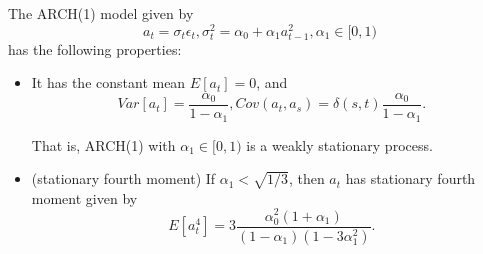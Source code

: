 \begin{lemma}\label{ch:time-series-analysis:th:weakStationaryARCH(1)}
The ARCH(1) model given by
$$a_t = \sigma_t \epsilon_t, \sigma_t^2 = \alpha_0 + \alpha_1a_{t-1}^2, \alpha_1 \in [0,1)$$
has the following properties:
\begin{itemize}
	\item It has the constant mean $E[a_t] = 0$, and $$Var[a_t] = \frac{\alpha_0}{1 - \alpha_1},Cov(a_t,a_s) = \delta(s,t) \frac{\alpha_0}{1 - \alpha_1}.$$
	
	That is, ARCH(1) with $\alpha_1\in [0,1)$ is a weakly stationary process. 
	\item (stationary fourth moment) If $\alpha_1 < \sqrt{1/3}$, then $a_t$ has stationary fourth moment given by
	$$E[a_t^4] = 3\frac{\alpha_0^2 (1 + \alpha_1)}{(1-\alpha_1)(1-3\alpha_1^2)}.
	$$
	
\end{itemize}
\end{lemma}
